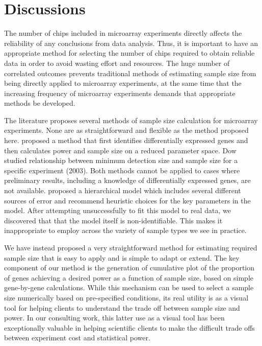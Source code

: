 \documentclass[12pt]{article}
\begin{document}
\section{Discussions}

The number of chips included in microarray experiments directly
affects the reliability of any conclusions from data analysis.
Thus, it is important to have an appropriate method for selecting
the number of chips required to obtain reliable data in order to
avoid wasting effort and resources. The huge number of correlated
outcomes prevents traditional methods of estimating sample size
from being directly applied to microarray experiments, at the same
time that the increasing frequency of microarray experiments
demands that appropriate methods be developed.

The literature proposes several methods of sample size calculation
for microarray experiments. None are as straightforward and flexible
as the method proposed here. \citet{Hwang02} proposed a method that
first identifies differentially expressed genes and then calculates
power and sample size on a reduced parameter space. Dow studied
relationship between minimum detection size and sample size for a
specific experiment (2003). Both methods cannot be applied to cases
where preliminary results, including a knowledge of differentially
expressed genes, are not available. \citet{Zien03} proposed a
hierarchical model which includes several different sources of error
and recommend heuristic choices for the key parameters in the model.
After attempting unsuccessfully to fit this model to real data, we
discovered that that the model itself is non-identifiable.  This
makes it inappropriate to employ across the variety of sample types
we see in practice.

We have instead proposed a very straightforward method for
estimating required sample size that is easy to apply and is simple
to adapt or extend. The key component of our method is the
generation of cumulative plot of the proportion of genes achieving a
desired power as a function of sample size, based on simple
gene-by-gene calculations.  While this mechanism can be used to
select a sample size numerically based on pre-specified conditions,
its real utility is as a visual tool for helping clients to
understand the trade off between sample size and power.  In our
consulting work, this latter use as a visual tool has been
exceptionally valuable in helping scientific clients to make the
difficult trade offs between experiment cost and statistical power.
\end{document}
